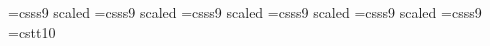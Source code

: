 




\font\titlefont=csss9 scaled
\font\middlefont=csss9 scaled
\font\textfont=csss9 scaled
\font\bbulletfont=csss9 scaled
\font\authorfont=csss9 scaled
\font\headerfont=csss9
\font\codefont=cstt10

\textfont

\def\hilitecolor{0 0 0}
\def\hhilitecolor{0.2 0.2 0.2}
\def\textcolor{0.4 0.4 0.4}
\def\pagenocolor{0.2 0.2 0.2}
\def\inactcolor{0.7 0.7 0.7}

\newbox\imgboxright \newbox\imgboxleft \newbox\textbox \newbox\bulletbox
\newdimen\textboxwidth \newdimen\tmpwidth \newbox\tmpbox
\newdimen\maxboxsize \newcount\oldpageno

\def\hilite#1{\special{color rgb \hilitecolor}#1\special{color rgb \textcolor}}

\def\hhilite#1{\special{color rgb \hhilitecolor}#1\special{color rgb \textcolor}}

\def\bullet#1{\ifx\firstbullet1\gdef\firstbullet{0}\else\vskip7pt\fi
\tmpwidth=\textboxwidth\advance\tmpwidth by-0.25in
\setbox\bulletbox=\vbox{\hsize=\tmpwidth{#1}}
\hbox{\hskip -12pt \vbox to\ht\bulletbox{\hsize=4mm\char126\vfil}\box\bulletbox}}
\def\bbullet#1{\ifx\firstbullet1\gdef\firstbullet{0}\else\vskip5pt\fi
\tmpwidth=\textboxwidth\advance\tmpwidth by-0.75in
\setbox\bulletbox=\vbox{\hsize=\tmpwidth\bbulletfont{#1}}
\hbox{\hskip 24pt \vbox to\ht\bulletbox{\hsize=4mm\bbulletfont*\vfil}\box\bulletbox}}

